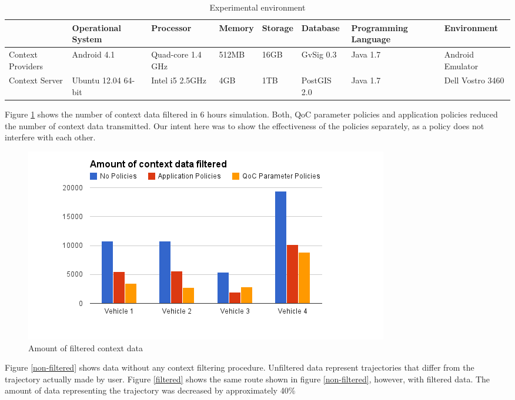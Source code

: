 \documentclass[letterpaper,conference]{IEEEtran}
\begin{document}
 \begin{center}
 \begin{table}[!t]
  \scriptsize
	\begin{tabular}{|p{1.6cm}|p{1.6cm}|p{1.6cm}|p{1.6cm}|p{1.6cm}|p{1.6cm}|p{1.6cm}|p{1.6cm}|}
	\hline
	\textbf{} & 
	\textbf{Operational System} & 
	\textbf{Processor} &
	\textbf{Memory} &
	\textbf{Storage} & 
	\textbf{Database} & 
	\textbf{Programming Language} &
	\textbf{Environment}\\ \hline
	    Context Providers    & Android 4.1 & Quad-core 1.4 GHz & 512MB  & 16GB & GvSig 0.3 & Java 1.7 & Android Emulator \\ \hline 
	    Context Server	    & Ubuntu 12.04 64-bit & Intel i5 2.5GHz & 4GB & 1TB & PostGIS 2.0 & Java 1.7 & Dell Vostro 3460 \\ \hline
	\end{tabular}
   \caption{Experimental environment}
   \label{tab:nonfloat}
  \end{table}
 \end{center} 
  
  Figure \ref{objectsent} shows the number of context data filtered in 6 hours 
  simulation. Both, QoC parameter policies and application policies reduced the 
  number of context data transmitted. Our intent here was to show the effectiveness 
  of the policies separately, as a policy does not interfere with each other.
  
 \begin{figure}[!h]
  \centering
  \includegraphics[scale=0.35]{imagens/amountdata}
  \caption{Amount of filtered context data}
  \label{objectsent}
 \end{figure}
  
  Figure \ref{non-filtered} shows data without any context filtering procedure. 
  Unfiltered data represent trajectories that differ from the trajectory actually made 
  ​​by user. Figure \ref{filtered} shows the same route shown in figure \ref{non-filtered}, 
  however, with filtered data. The amount of data representing the trajectory was decreased
  by approximately 40\%
  
\end{document}
